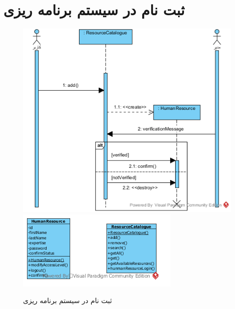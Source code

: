 \section{ثبت نام در سیستم برنامه ریزی}
\begin{figure}[H]
	\centering
	\includegraphics[scale=0.9]{img/sequence-analysis/SignUp}
	\includegraphics[scale=0.9]{img/sequence-analysis/SignUpC}
	\caption{ثبت نام در سیستم برنامه ریزی}
\end{figure}

